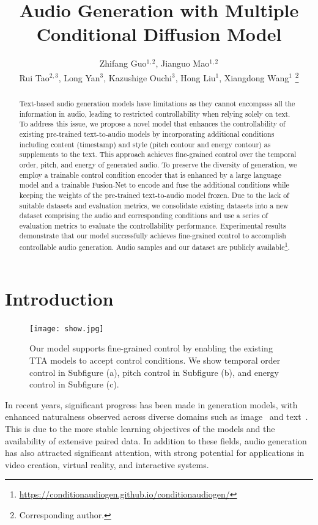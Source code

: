 \documentclass[letterpaper]{article} %
\title{Audio Generation with Multiple Conditional Diffusion Model}
\author {
    Zhifang Guo$^{1,2}$,
    Jianguo Mao$^{1,2}$ \\
    Rui Tao$^{2,3}$,
    Long Yan$^{3}$,
    Kazushige Ouchi$^{3}$,
    Hong Liu$^{1}$,
    Xiangdong Wang$^{1}$
    \thanks{Corresponding author.}
}
\begin{document}
\maketitle

\begin{abstract}

Text-based audio generation models have limitations as they cannot encompass all the information in audio, leading to restricted controllability when relying solely on text. To address this issue, we propose a novel model that enhances the controllability of existing pre-trained text-to-audio models by incorporating additional conditions including content (timestamp) and style (pitch contour and energy contour) as supplements to the text. This approach achieves fine-grained control over the temporal order, pitch, and energy of generated audio. To preserve the diversity of generation, we employ a trainable control condition encoder that is enhanced by a large language model and a trainable Fusion-Net to encode and fuse the additional conditions while keeping the weights of the pre-trained text-to-audio model frozen. Due to the lack of suitable datasets and evaluation metrics, we consolidate existing datasets into a new dataset comprising the audio and corresponding conditions and use a series of evaluation metrics to evaluate the controllability performance. Experimental results demonstrate that our model successfully achieves fine-grained control to accomplish controllable audio generation. Audio samples and our dataset are publicly available\footnote{\url{https://conditionaudiogen.github.io/conditionaudiogen/}}.

\end{abstract}

\section{Introduction}

\begin{figure}[!t]
    \centering
    \texttt{[image: show.jpg]}
    \caption{Our model supports fine-grained control by enabling the existing TTA models to accept control conditions. We show temporal order control in Subfigure (a), pitch control in Subfigure (b), and energy control in Subfigure (c).}
    \label{show}
\end{figure}

In recent years, significant progress has been made in generation models, with enhanced naturalness observed across diverse domains such as image~\cite{ramesh2022dalle2,chen2020igpt,nichol2022glide} and text~\cite{radford2020gpt3,schick2023peer,kong2020panns}. This is due to the more stable learning objectives of the models and the availability of extensive paired data. In addition to these fields, audio generation has also attracted significant attention, with strong potential for applications in video creation, virtual reality, and interactive systems.
\end{document}
